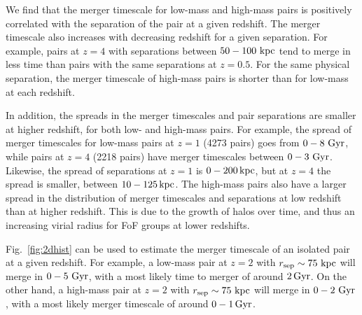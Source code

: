 \documentclass[twocolumn,linenumbers]{aastex631}
\begin{document}
    We find that the merger timescale for low-mass and high-mass pairs is positively correlated with the separation of the pair at a given redshift. 
    The merger timescale also increases with decreasing redshift for a given separation.
    For example, pairs at $z=4$ with separations between $50-100\,\mathrm{\,kpc}$ tend to merge in less time than pairs with the same separations at $z=0.5$. 
    For the same physical separation, the merger timescale of high-mass pairs is shorter than for low-mass at each redshift. 
    
    In addition, the spreads in the merger timescales and pair separations are smaller at higher redshift, for both low- and high-mass pairs. 
    For example, the spread of merger timescales for low-mass pairs at $z=1$ (4273 pairs) goes from $0-8\,\mathrm{\,Gyr}$, while pairs at $z=4$ (2218 pairs) have merger timescales between $0-3\,\mathrm{\,Gyr}$. 
    Likewise, the spread of separations at $z=1$ is $0-200\mathrm{\,kpc}$, but at $z=4$ the spread is smaller, between $10-125\mathrm{\,kpc}$. 
    The high-mass pairs also have a larger spread in the distribution of merger timescales and separations at low redshift than at higher redshift.
    This is due to the growth of halos over time, and thus an increasing virial radius for FoF groups at lower redshifts. 

    Fig.~\ref{fig:2dhist} can be used to estimate the merger timescale of an isolated pair at a given redshift. 
    For example, a low-mass pair at $z=2$ with $r_{\mathrm{sep}}\sim 75\,\mathrm{\,kpc}$ will merge in $0-5\,\mathrm{\,Gyr}$, with a most likely time to merger of around $2\mathrm{\,Gyr}$.
    On the other hand, a high-mass pair at $z=2$ with $r_{\mathrm{sep}}\sim 75\,\mathrm{\,kpc}$ will merge in $0-2\,\mathrm{\,Gyr}$, with a most likely merger timescale of around $0-1\mathrm{\,Gyr}$.

    
    
    
    
\end{document}
